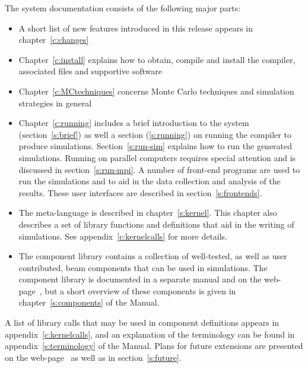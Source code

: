 The \MCX system documentation consists of the following major
parts:
\begin{itemize}
\item A short list of new features introduced in this \MCX release
  appears in chapter~\ref{c:changes}
\item Chapter~\ref{c:install} explains how to obtain, compile
  and install the \MCX compiler, associated files and supportive software
\item Chapter~\ref{c:MCtechniques} concerns Monte Carlo techniques
  and simulation strategies in general
\item Chapter~\ref{c:running} includes a brief introduction to the
  \MCX system (section~\ref{s:brief}) as well a section (\ref{s:running}) on running the compiler to produce
  simulations. Section~\ref{s:run-sim} explains how to run the generated
  simulations. Running \MCX on parallel computers requires special
  attention and is discussed in section~\ref{s:run-mpi}. A number of front-end programs are used to run the
  simulations and to aid in the data collection and analysis of the
  results. These user interfaces are described in section~\ref{s:frontends}.
\item The \MCX meta-language is described in chapter~\ref{s:kernel}. This
  chapter also describes a set of library functions and definitions
  that aid in the writing of simulations. See
  appendix~\ref{c:kernelcalls} for more details.
\item The \MCX component library contains a collection of
  well-tested, as well as user contributed, beam components that can be used in simulations.
  The \MCX component library is documented in a separate manual
  and on the \MCX web-page~\cite{mcxtrace_webpage}, but a short overview of these
  components is given in chapter~\ref{s:components} of the Manual.
\end{itemize}

A list of library calls that may be used in component definitions
appears in appendix~\ref{c:kernelcalls}, and
an explanation of the \MCX terminology can be
found in appendix~\ref{s:terminology} of the Manual.
Plans for future extensions are presented on the \MCX web-page~\cite{mcxtrace_webpage} as well as in section~\ref{s:future}.


